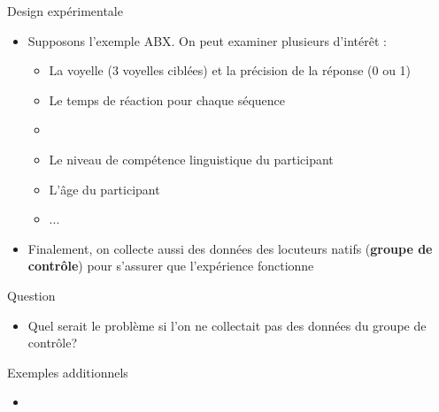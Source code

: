 \documentclass[xcolor=dvipsnames, onlymath, 10pt, aspectratio=169, handout]{beamer}
\begin{document}



\begin{frame}[t]{Design expérimentale}

	\begin{itemize}
		\item Supposons l'exemple ABX. On peut examiner plusieurs  d'intérêt :

		      \begin{itemize}
			      \pause
			      \item La voyelle (3 voyelles ciblées) et la précision de la réponse (0 ou 1)
			            \pause
			      \item Le temps de réaction pour chaque séquence
			      \item[]
			            \pause
			      \item Le niveau de compétence linguistique du participant
			            \pause
			      \item L'âge du participant
			      \item ...
		      \end{itemize}

		      \pause

		\item Finalement, on collecte aussi des données des locuteurs natifs (\textbf{groupe de contrôle}) pour s'assurer que l'expérience fonctionne
	\end{itemize}

	\begin{center}
		\begin{importanttitle}{Question}

			\begin{itemize}
				\item[\winner] Quel serait le problème si l’on ne collectait pas des données du groupe de contrôle?
			\end{itemize}


		\end{importanttitle}
	\end{center}

\end{frame}


\begin{frame}{Exemples additionnels}{}

	\begin{itemize}
		\item[] 

	\end{itemize}

	\begin{center}
		\vfill
		\vfill
	\end{center}

\end{frame}
\end{document}
